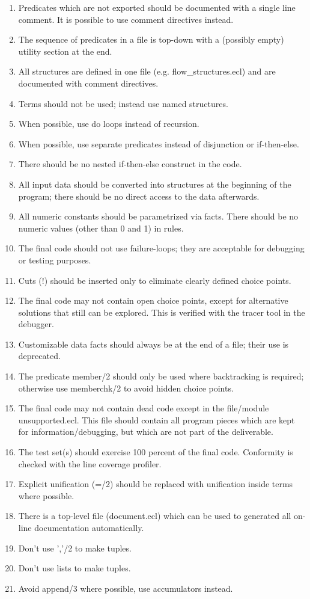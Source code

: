 \documentclass[a4paper,12pt]{report}
\begin{document}
\begin{enumerate}
\item  Predicates which are not exported should be documented with a single line comment. It is possible to use comment directives instead.
\item  The sequence of predicates in a file is top-down with a (possibly empty) utility section at the end.
\item  All structures are defined in one file (e.g. flow\_structures.ecl) and are documented with comment directives.
\item  Terms should not be used; instead use named structures.
\item  When possible, use do loops instead of recursion.
\item  When possible, use separate predicates instead of disjunction or if-then-else.
\item  There should be no nested if-then-else construct in the code.
\item  All input data should be converted into structures at the beginning of the program; there should be no direct access to the data afterwards. 
\item  All numeric constants should be parametrized via facts. There should be no numeric values (other than 0 and 1) in rules.
\item The final code should not use failure-loops; they are acceptable for debugging or testing purposes.
\item  Cuts (!)  should be inserted only to eliminate clearly defined choice points.
\item  The final code may not contain open choice points, except for alternative solutions that still can be explored. This is verified with the tracer tool in the debugger.
\item  Customizable data facts should always be at the end of a file; their use is deprecated.
\item  The predicate member/2 should only be used where backtracking is required; otherwise use memberchk/2 to avoid hidden choice points.
\item  The final code may not contain dead code except in the file/module unsupported.ecl. This file should contain all program pieces which are kept for information/debugging, but which are not part of the deliverable.
\item  The test set(s) should exercise 100 percent of the final code. Conformity is checked with the line coverage profiler.
\item  Explicit unification (=/2) should be replaced with unification inside terms where possible.
\item  There is a top-level file (document.ecl) which can be used to generated all on-line documentation automatically.
\item  Don't use ','/2 to make tuples.
\item  Don't use lists to make tuples.
\item  Avoid append/3 where possible, use accumulators instead.
\end{enumerate}
\end{document}
